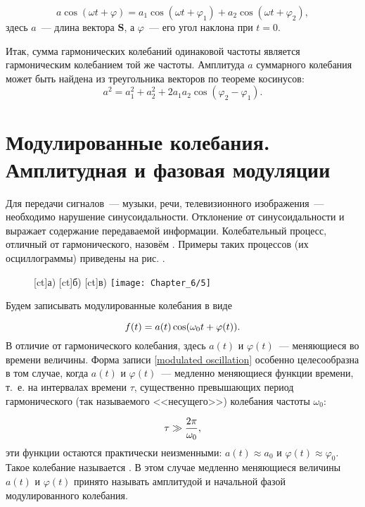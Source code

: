 \begin{equation*}
	a\cos(\omega t + \varphi)=a_1\cos(\omega t+\varphi_1)+a_2\cos(\omega t + \varphi_2),
\end{equation*}
здесь $a$~--- длина вектора $\mathbf{S}$, а $\varphi$~--- его угол наклона при $t = 0$.

Итак, сумма гармонических колебаний одинаковой частоты является гармоническим колебанием той же частоты. Амплитуда $a$
суммарного колебания может быть найдена из треугольника векторов по теореме косинусов:
\begin{equation*}
	a^2=a_1^2+a_2^2+2a_1a_2\cos(\varphi_2-\varphi_1).
\end{equation*}

\section{Модулированные колебания. Амплитудная и фазовая модуляции}

Для передачи сигналов~--- музыки, речи, телевизионного изображения~--- необходимо нарушение синусоидальности. Отклонение
от синусоидальности и выражает содержание передаваемой информации. Колебательный процесс, отличный от гармонического,
назовём . Примеры таких процессов (их осциллограммы) приведены на рис. .

\begin{figure}[h!]
	[ct]{а)}
	[ct]{б)}
	[ct]{в)}
	\texttt{[image: Chapter\_6/5]}
	\caption{}
\end{figure}

Будем записывать модулированные колебания в виде

\begin{equation}
	\eqmark{modulated oscillation}
	f(t)=a(t)\cos(\omega_0t+\varphi(t)).
\end{equation}
В отличие от гармонического колебания, здесь $a(t)$ и $\varphi(t)$~--- меняющиеся во времени величины. Форма записи \eqref{modulated oscillation}
особенно целесообразна в том случае, когда $a(t)$ и $\varphi(t)$~--- медленно меняющиеся функции времени, т.~е. на
интервалах времени $\tau$, существенно превышающих период гармонического (так называемого <<несущего>>) колебания
частоты $\omega_0$:

\begin{equation}
	\eqmark{quasiharmonic oscillation - tau}
	\tau \gg \frac{2\pi}{\omega_0},
\end{equation}
эти функции остаются практически неизменными: $a(t)\approx a_{0}$ и $\varphi(t)\approx\varphi_0$. Такое колебание называется
. В этом случае медленно меняющиеся величины $a(t)$ и $\varphi(t)$ принято называть амплитудой и
начальной фазой модулированного колебания.

